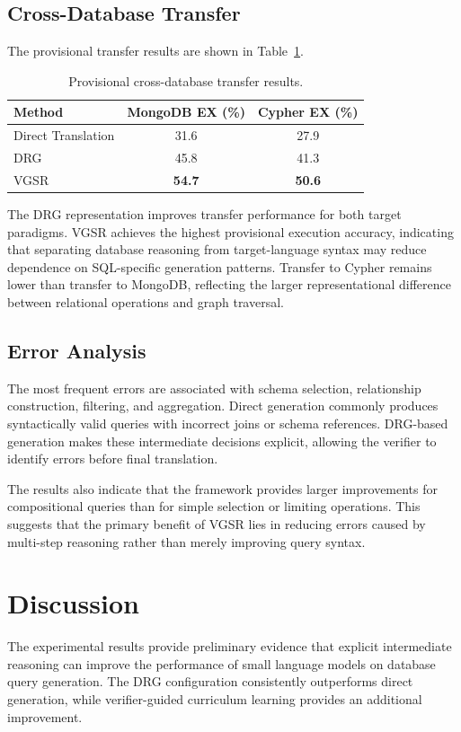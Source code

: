 \documentclass[conference]{IEEEtran}
\begin{document}
\subsection{Cross-Database Transfer}
The provisional transfer results are shown in Table~\ref{tab:transfer}.

\begin{table}[t]
\centering
\caption{Provisional cross-database transfer results.}
\label{tab:transfer}
\begin{tabular}{lcc}
\toprule
Method & MongoDB EX (\%) & Cypher EX (\%)\\
\midrule
Direct Translation & 31.6 & 27.9\\
DRG & 45.8 & 41.3\\
VGSR & \textbf{54.7} & \textbf{50.6}\\
\bottomrule
\end{tabular}
\end{table}

The DRG representation improves transfer performance for both target paradigms. VGSR achieves the highest provisional execution accuracy, indicating that separating database reasoning from target-language syntax may reduce dependence on SQL-specific generation patterns. Transfer to Cypher remains lower than transfer to MongoDB, reflecting the larger representational difference between relational operations and graph traversal.

\subsection{Error Analysis}
The most frequent errors are associated with schema selection, relationship construction, filtering, and aggregation. Direct generation commonly produces syntactically valid queries with incorrect joins or schema references. DRG-based generation makes these intermediate decisions explicit, allowing the verifier to identify errors before final translation.

The results also indicate that the framework provides larger improvements for compositional queries than for simple selection or limiting operations. This suggests that the primary benefit of VGSR lies in reducing errors caused by multi-step reasoning rather than merely improving query syntax.

\section{Discussion}
The experimental results provide preliminary evidence that explicit intermediate reasoning can improve the performance of small language models on database query generation. The DRG configuration consistently outperforms direct generation, while verifier-guided curriculum learning provides an additional improvement.
\end{document}
